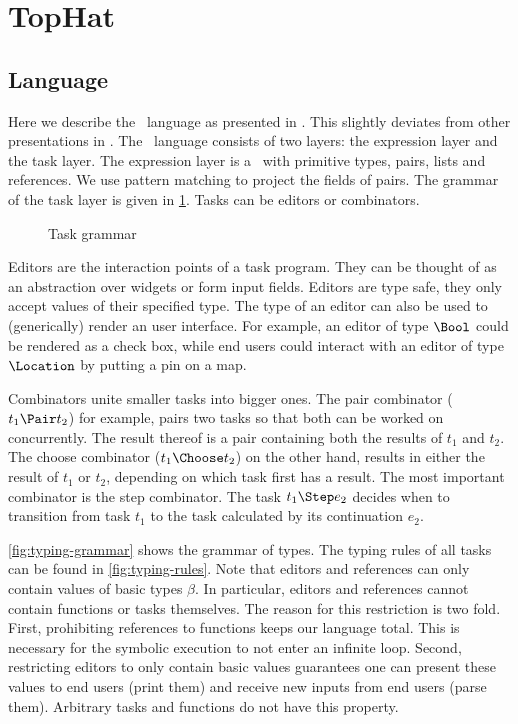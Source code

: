
\section{TopHat}

\subsection{Language}

Here we describe the \TOPHAT\ language as presented in \cite{Steenvoorden22}.
This slightly deviates from other presentations in \cite{conf/ppdp/SteenvoordenNK19,conf/ifl/NausSK19,conf/sfp/NausS20}.
The \TOPHAT\ language consists of two layers: the expression layer and the task layer.
The expression layer is a \STLC\ with primitive types, pairs, lists and references.
We use pattern matching to project the fields of pairs.
The grammar of the task layer is given in \cref{fig:task-grammar}.
Tasks can be editors or combinators.

\begin{figure}[h]
  \caption{Task grammar}
  \label{fig:task-grammar}
\end{figure}

Editors are the interaction points of a task program.
They can be thought of as an abstraction over widgets or form input fields.
Editors are type safe,
they only accept values of their specified type.
The type of an editor can also be used to (generically) render an user interface.
For example,
an editor of type $\Bool$ could be rendered as a check box,
while end users could interact with an editor of type $\Location$ by putting a pin on a map.

Combinators unite smaller tasks into bigger ones.
The pair combinator ($t_1 \Pair t_2$) for example,
pairs two tasks so that both can be worked on concurrently.
The result thereof is a pair containing both the results of $t_1$ and $t_2$.
The choose combinator ($t_1 \Choose t_2$) on the other hand,
results in either the result of $t_1$ or $t_2$,
depending on which task first has a result.
The most important combinator is the step combinator.
The task $t_1 \Step e_2$ decides when to transition from task $t_1$
to the task calculated by its continuation $e_2$.


\cref{fig:typing-grammar} shows the grammar of types.
The typing rules of all tasks can be found in \cref{fig:typing-rules}.
Note that editors and references can only contain values of basic types $\beta$.
In particular, editors and references cannot contain functions or tasks themselves.
The reason for this restriction is two fold.
First, prohibiting references to functions keeps our language total.
This is necessary for the symbolic execution to not enter an infinite loop.
Second, restricting editors to only contain basic values
guarantees one can present these values to end users (print them)
and receive new inputs from end users (parse them).
Arbitrary tasks and functions do not have this property.

